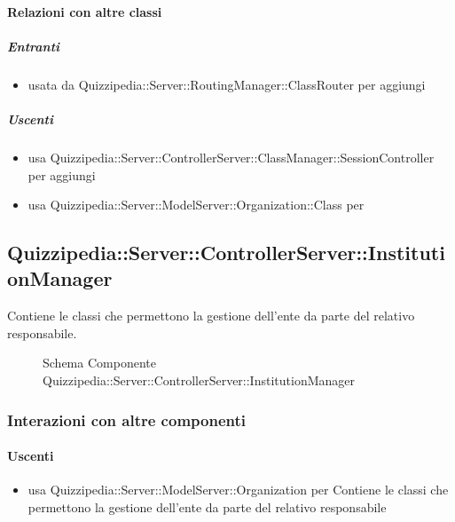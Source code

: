 \paragraph{Relazioni con altre classi}
\subparagraph{Entranti}
\begin{itemize}
\item usata da Quizzipedia::Server::RoutingManager::ClassRouter per aggiungi
\end{itemize}
\subparagraph{Uscenti}
\begin{itemize}
\item usa Quizzipedia::Server::ControllerServer::ClassManager::SessionController per aggiungi
\item usa Quizzipedia::Server::ModelServer::Organization::Class per 
\end{itemize}
\subsection{Quizzipedia::Server::ControllerServer::InstitutionManager}
Contiene le classi che permettono la gestione dell'ente da parte del relativo responsabile.
\begin{figure}[H]
\centering
\noindent{}
\caption[Schema Componente Quizzipedia::Server::ControllerServer::InstitutionManager]{Schema Componente Quizzipedia::Server::ControllerServer::InstitutionManager}
\end{figure}
\subsubsection{Interazioni con altre componenti}
\paragraph{Uscenti}
\begin{itemize}
\item usa Quizzipedia::Server::ModelServer::Organization per Contiene le classi che permettono la gestione dell'ente da parte del relativo responsabile
\end{itemize}
